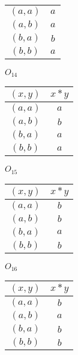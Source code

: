 \documentclass[12pt]{article}
\begin{document}
\begin{flushleft}
\begin{enumerate}
\begin{minipage}[h]{.2\textwidth}
\begin{tabular}{ c | c }
        	\hline
        	$(a,a)$ & $a$ \\
        	$(a,b)$ & $a$ \\
        	$(b,a)$ & $b$ \\
        	$(b,b)$ & $a$
      	\end{tabular}
    	\end{minipage}
    	\begin{minipage}[h]{.2\textwidth}
				$O_{14}$
    		\begin{tabular}{ c | c }
      		$(x,y)$ & $x*y$ \\
        	\hline
        	$(a,a)$ & $a$ \\
        	$(a,b)$ & $b$ \\
        	$(b,a)$ & $a$ \\
        	$(b,b)$ & $a$
      	\end{tabular}
    	\end{minipage}
    	\begin{minipage}[h]{.2\textwidth}
				$O_{15}$
    		\begin{tabular}{ c | c }
      		$(x,y)$ & $x*y$ \\
        	\hline
        	$(a,a)$ & $b$ \\
        	$(a,b)$ & $b$ \\
        	$(b,a)$ & $a$ \\
        	$(b,b)$ & $b$
      	\end{tabular}
    	\end{minipage}
    	\begin{minipage}[h]{.2\textwidth}
				$O_{16}$
    		\begin{tabular}{ c | c }
      		$(x,y)$ & $x*y$ \\
        	\hline
        	$(a,a)$ & $b$ \\
        	$(a,b)$ & $a$ \\
        	$(b,a)$ & $b$ \\
        	$(b,b)$ & $b$
      	\end{tabular}
    	\end{minipage}          	 	 	
  \end{enumerate}














\end{flushleft}
\end{document}
